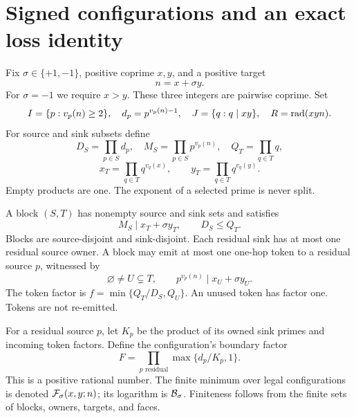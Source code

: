 \section{Signed configurations and an exact loss identity}
Fix \(\sigma\in\{+1,-1\}\), positive coprime \(x,y\), and a positive target
\[
 n=x+\sigma y.
\]
For \(\sigma=-1\) we require \(x>y\). These three integers are pairwise coprime. Set
\[
 I=\{p:v_p(n)\ge2\},\quad d_p=p^{v_p(n)-1},\quad
 J=\{q:q\mid xy\},\quad R=\operatorname{rad}(xyn).
\]
For source and sink subsets define
\[
 D_S=\prod_{p\in S}d_p,\quad M_S=\prod_{p\in S}p^{v_p(n)},\quad
 Q_T=\prod_{q\in T}q,
\]
\[
 x_T=\prod_{q\in T}q^{v_q(x)},\qquad
 y_T=\prod_{q\in T}q^{v_q(y)}.
\]
Empty products are one. The exponent of a selected prime is never split.

\begin{definition}
A block \((S,T)\) has nonempty source and sink sets and satisfies
\begin{equation}\label{signed:eq:block}
 M_S\mid x_T+\sigma y_T,\qquad D_S\le Q_T.
\end{equation}
Blocks are source-disjoint and sink-disjoint. Each residual sink has at most one residual source owner. A block may emit at most one one-hop token to a residual source \(p\), witnessed by
\begin{equation}\label{signed:eq:flag}
 \varnothing\ne U\subsetneq T,\qquad p^{v_p(n)}\mid x_U+\sigma y_U.
\end{equation}
The token factor is \(f=\min\{Q_T/D_S,Q_U\}\). An unused token has factor one. Tokens are not re-emitted.
\end{definition}
For a residual source \(p\), let \(K_p\) be the product of its owned sink primes and incoming token factors. Define the configuration's boundary factor
\[
 F=\prod_{p\text{ residual}}\max\{d_p/K_p,1\}.
\]
This is a positive rational number. The finite minimum over legal configurations is denoted \(\mathcal F_\sigma(x,y;n)\); its logarithm is \(\mathcal B_\sigma\). Finiteness follows from the finite sets of blocks, owners, targets, and faces.

